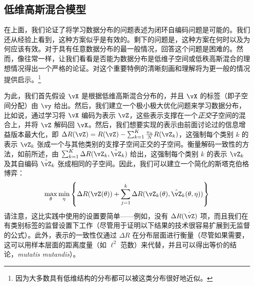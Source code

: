 \documentclass[../../book-main_zh.tex]{subfiles}
\begin{document}

\subsection{低维高斯混合模型}

在上面，我们论证了将学习数据分布的问题表述为闭环自编码问题是可能的。我们还从经验上看到，这种方案似乎是有效的。剩下的问题是，这种方案在何时以及为何应该有效。对于具有任意数据分布的最一般情况，回答这个问题是困难的。然而，像往常一样，让我们看看是否能为数据分布是低维子空间或低秩高斯混合的理想情况得出一个严格的论证。对这个重要特例的清晰刻画和理解将为更一般的情况提供启示。\footnote{因为大多数具有低维结构的分布都可以被这类分布很好地近似。}

为此，我们首先假设 \(\vX\) 是根据低维高斯混合分布的，并且 \(\vX\) 的标签（即子空间分配）由 \(\vy\) 给出。然后，我们建立一个极小极大优化问题来学习数据分布，比如说，通过学习将 \(\vX\) 编码为表示 \(\vZ\)，这些表示支撑在一个\textit{正交}子空间的混合上，并将 \(\vZ\) 解码回 \(\vX\)。然后，我们想要实现的表示由前面讨论过的信息增益版本最大化，即 \(\Delta R(\vZ) = R(\vZ) - \sum_{k = 1}^{K}\frac{n_{k}}{N}R(\vZ_{k})\)，这强制每个类别 \(k\) 的表示 \(\vZ_{k}\) 张成一个与其他类别的支撑子空间正交的子空间。衡量解码一致性的方法，如前所述，由 \(\sum_{k = 1}^{K}\Delta R(\vZ_{k}, \hat{\vZ}_{k})\) 给出，这强制每个类别 \(k\) 的表示 \(\vZ_{k}\) 及其自编码 \(\hat{\vZ}_{k}\) 张成相同的子空间。因此，我们可以建立一个简化的斯塔克伯格博弈：
\begin{equation}\label{eq:ctrl_msp_game}
    \max_{\theta}\min_{\eta}\bc{\Delta R(\vZ(\theta)) + \sum_{j = 1}^{k}\Delta R(\vZ_{k}(\theta), \hat{\vZ}_{k}(\theta, \eta))}
\end{equation}
请注意，这比实践中使用的设置要简单——例如，没有 \(\Delta R(\hat{\vZ})\) 项，而且我们在有类别标签的监督设置下工作（尽管用于证明以下结果的技术很容易扩展到无监督的公式）。此外，表示的一致性仅通过 \(\Delta R\) 在分布层面进行衡量（尽管如果需要，这可以用样本层面的距离度量（如 \(\ell^{2}\) 范数）来代替，并且可以得出等价的结论，\textit{mutatis mutandis}）。
\end{document}
